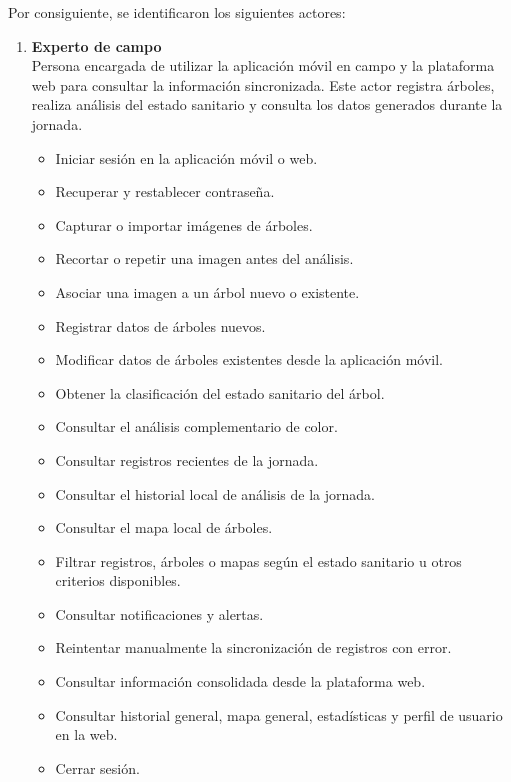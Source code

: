 Por consiguiente, se identificaron los siguientes actores:

\begin{enumerate}
    \item \textbf{Experto de campo}\\
    Persona encargada de utilizar la aplicación móvil en campo y la plataforma web para consultar la información sincronizada. Este actor registra árboles, realiza análisis del estado sanitario y consulta los datos generados durante la jornada.
        \begin{itemize}
            \item Iniciar sesión en la aplicación móvil o web.
            \item Recuperar y restablecer contraseña.
            \item Capturar o importar imágenes de árboles.
            \item Recortar o repetir una imagen antes del análisis.
            \item Asociar una imagen a un árbol nuevo o existente.
            \item Registrar datos de árboles nuevos.
            \item Modificar datos de árboles existentes desde la aplicación móvil.
            \item Obtener la clasificación del estado sanitario del árbol.
            \item Consultar el análisis complementario de color.
            \item Consultar registros recientes de la jornada.
            \item Consultar el historial local de análisis de la jornada.
            \item Consultar el mapa local de árboles.
            \item Filtrar registros, árboles o mapas según el estado sanitario u otros criterios disponibles.
            \item Consultar notificaciones y alertas.
            \item Reintentar manualmente la sincronización de registros con error.
            \item Consultar información consolidada desde la plataforma web.
            \item Consultar historial general, mapa general, estadísticas y perfil de usuario en la web.
            \item Cerrar sesión.
        \end{itemize}


\end{enumerate}
